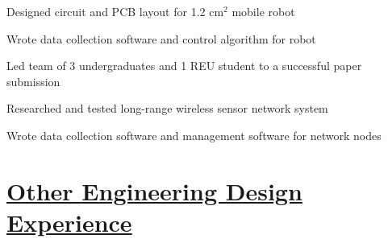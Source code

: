 \documentclass[12pt,letterpaper]{deedy-resume} %
\begin{document}
\begin{minipage}[t]{1\textwidth}
\sectionspace %



\begin{tightitemize}
\item Designed circuit and PCB layout for 1.2 cm$^2$ mobile robot
\item Wrote data collection software and control algorithm for robot
\item Led team of 3 undergraduates and 1 REU student to a successful paper submission
\end{tightitemize}

\sectionspace %



\begin{tightitemize}
\item Researched and tested long-range wireless sensor network system
\item Wrote data collection software and management software for network nodes
\end{tightitemize}

\sectionspace


\section{\underline{Other Engineering Design Experience}}

\vspace{0.2cm}



\begin{tightitemize}


\end{tightitemize}
\end{minipage}
\end{document}
